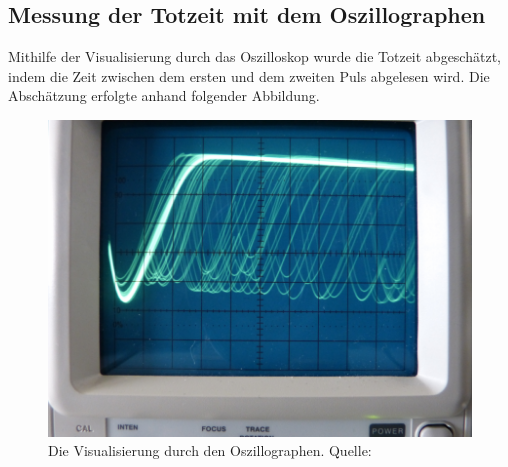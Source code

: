 \subsection{Messung der Totzeit mit dem Oszillographen}
  Mithilfe der Visualisierung durch das Oszilloskop wurde die Totzeit abgeschätzt, indem die Zeit
  zwischen dem ersten und dem zweiten Puls abgelesen wird. Die Abschätzung erfolgte anhand folgender
  Abbildung.
  \begin{figure}[H]
    \centering
      \includegraphics[scale=0.3]{content/Osz.png}
      \caption{Die Visualisierung durch den Oszillographen. Quelle:\cite{AP02}}
      \label{fig:totzeit1}
  \end{figure}
